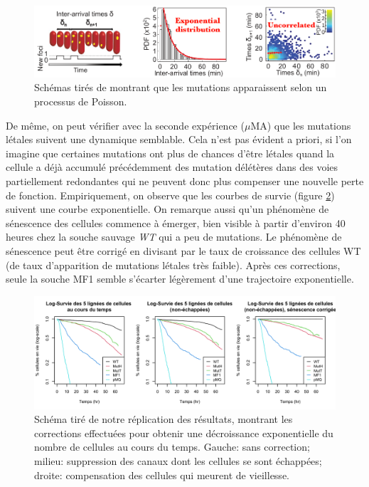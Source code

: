 \documentclass[12pt]{article}
\begin{document}
\begin{figure}[h]
  \begin{center}
    \vspace{3mm}
    \includegraphics[scale=0.45]{../Img/Interarrival_times.png}
  \end{center}  
  \caption{\label{fig:iatime}Schémas tirés de \cite{rob} montrant que les mutations apparaissent selon un processus de Poisson.}
\end{figure}
\FloatBarrier

De même, on peut vérifier avec la seconde expérience ($\mu$MA) que les mutations létales suivent une dynamique semblable. Cela n'est pas évident a priori, si l'on imagine que certaines mutations ont plus de chances d'être létales quand la cellule a déjà accumulé précédemment des mutation délétères dans des voies partiellement redondantes qui ne peuvent donc plus compenser une nouvelle perte de fonction. Empiriquement, on observe que les courbes de survie (figure \ref{fig:survival}) suivent une courbe exponentielle. On remarque aussi qu'un phénomène de sénescence des cellules commence à émerger, bien visible à partir d'environ 40 heures chez la souche sauvage \emph{WT} qui a peu de mutations. Le phénomène de sénescence peut être corrigé en divisant par le taux de croissance des cellules WT (de taux d'apparition de mutations létales très faible). Après ces corrections, seule la souche MF1 semble s'écarter légèrement d'une trajectoire exponentielle.

\begin{figure}[h]
  \begin{center}
    \vspace{3mm}
    \includegraphics[scale=0.3]{../Img/Survival.png}
  \end{center} 
  \caption{\label{fig:survival}Schéma tiré de notre réplication des résultats, montrant les corrections effectuées pour obtenir une décroissance exponentielle du nombre de cellules au cours du temps. Gauche: sans correction; milieu: suppression des canaux dont les cellules se sont échappées; droite: compensation des cellules qui meurent de vieillesse.}
\end{figure}
\end{document}
